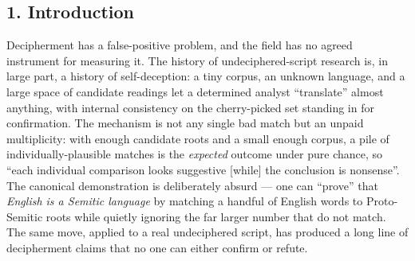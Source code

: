 \documentclass[
  10pt,
]{article}
\begin{document}
\hypertarget{introduction}{%
\subsection{1. Introduction}\label{introduction}}

Decipherment has a false-positive problem, and the field has no agreed
instrument for measuring it. The history of undeciphered-script research
is, in large part, a history of self-deception: a tiny corpus, an
unknown language, and a large space of candidate readings let a
determined analyst ``translate'' almost anything, with internal
consistency on the cherry-picked set standing in for confirmation. The
mechanism is not any single bad match but an unpaid multiplicity: with
enough candidate roots and a small enough corpus, a pile of
individually-plausible matches is the \emph{expected} outcome under pure
chance, so ``each individual comparison looks suggestive {[}while{]} the
conclusion is nonsense''. The canonical demonstration is deliberately
absurd --- one can ``prove'' that \emph{English is a Semitic language}
by matching a handful of English words to Proto-Semitic roots while
quietly ignoring the far larger number that do not match. The same move,
applied to a real undeciphered script, has produced a long line of
decipherment claims that no one can either confirm or refute.
\end{document}
